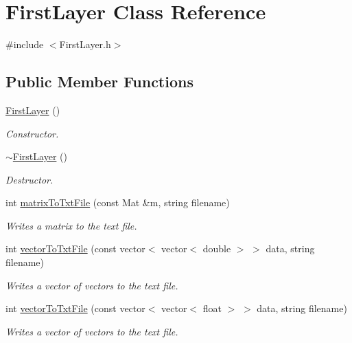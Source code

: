 \hypertarget{class_first_layer}{\section{First\-Layer Class Reference}
\label{class_first_layer}
}


{\ttfamily \#include $<$First\-Layer.\-h$>$}

\subsection*{Public Member Functions}
\begin{DoxyCompactItemize}
\item 
\hyperlink{class_first_layer_a2c91a3e201cb46ef6f597cefe87b35a0}{First\-Layer} ()
\begin{DoxyCompactList}\small\item\em Constructor. \end{DoxyCompactList}\item 
\hyperlink{class_first_layer_a6cec9185f94b6bf4c99b6eda97e4d73b}{$\sim$\-First\-Layer} ()
\begin{DoxyCompactList}\small\item\em Destructor. \end{DoxyCompactList}\item 
int \hyperlink{class_first_layer_aa6c046c60d3b3269e93955b07b15986b}{matrix\-To\-Txt\-File} (const Mat \&m, string filename)
\begin{DoxyCompactList}\small\item\em Writes a matrix to the text file. \end{DoxyCompactList}\item 
int \hyperlink{class_first_layer_a14e6821bc705c01d174685335b20322a}{vector\-To\-Txt\-File} (const vector$<$ vector$<$ double $>$ $>$ data, string filename)
\begin{DoxyCompactList}\small\item\em Writes a vector of vectors to the text file. \end{DoxyCompactList}\item 
int \hyperlink{class_first_layer_a7a31ab9f8833c145dc2b94cba91f3d70}{vector\-To\-Txt\-File} (const vector$<$ vector$<$ float $>$ $>$ data, string filename)
\begin{DoxyCompactList}\small\item\em Writes a vector of vectors to the text file. \end{DoxyCompactList}\item 

\end{DoxyCompactItemize}
